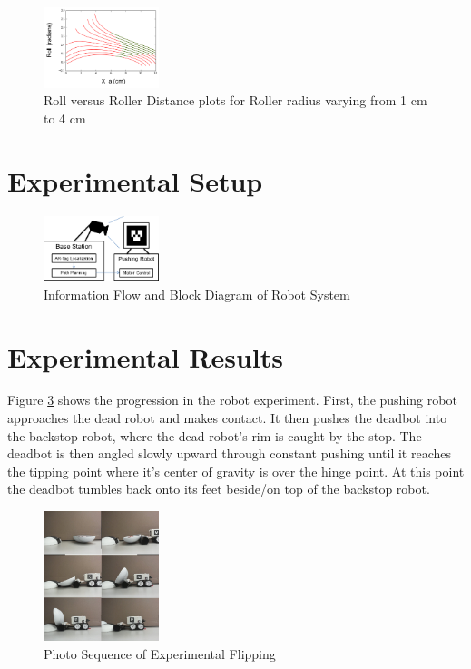 \documentclass[conference]{IEEEtran}
\begin{document}
\begin{figure}[h!]
\centering
\includegraphics[width=0.3\textwidth]{Flip_Traces.png}
\caption{\label{fig:traces}Roll versus Roller Distance plots for Roller radius varying from 1 cm to 4 cm}
\end{figure}

\section{Experimental Setup}

\begin{figure}[h!]
\centering
\includegraphics[width=0.3\textwidth]{System_Block_Diagram.png}
\caption{\label{fig:system}Information Flow and Block Diagram of Robot System}
\end{figure}

\section{Experimental Results}
Figure \ref{fig:photos} shows the progression in the robot experiment. First, the pushing robot approaches the dead robot and makes contact. It then pushes the deadbot into the backstop robot, where the dead robot's rim is caught by the stop. The deadbot is then angled slowly upward through constant pushing until it reaches the tipping point where it's center of gravity is over the hinge point. At this point the deadbot tumbles back onto its feet beside/on top of the backstop robot.

\begin{figure}[h!]
\centering
\includegraphics[width=0.3\textwidth]{Photo_Sequence.jpg}
\caption{\label{fig:photos}Photo Sequence of Experimental Flipping}
\end{figure}
\end{document}
